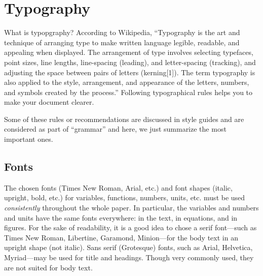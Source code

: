 \chapter{Typography} %
What is typopgraphy? According to Wikipedia, 
``Typography is the art and technique of arranging type to make written language legible, readable, and appealing when displayed. 
The arrangement of type involves selecting typefaces, point sizes, line lengths, line-spacing (leading), and letter-spacing (tracking), and adjusting the space between pairs of letters (kerning[1]). 
The term typography is also applied to the style, arrangement, and appearance of the letters, numbers, and symbols created by the process.'' 
Following typographical rules helps you to make your document clearer. 

Some of these rules or recommendations are discussed in style guides and are considered as part of ``grammar'' and here, we just summarize the most important ones. 


\section{Fonts} %
The chosen fonts (Times New Roman, Arial, etc.) and font shapes (italic, upright, bold, etc.) for variables, functions, numbers, units, etc. must be used \emph{consistently} throughout the whole paper. 
In particular, the variables and numbers and units have the same fonts everywhere: 
in the text, in equations, and in figures.
For the sake of readability, it is a good idea to chose a serif font---such as Times New Roman, Libertine, Garamond, Minion---for the body text in an upright shape (not italic). 
Sans serif (Grotesque) fonts, such as Arial, Helvetica, Myriad---may be used for title and headings. 
Though very commonly used, they are not suited for body text. 



